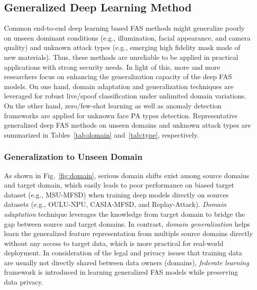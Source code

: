 \documentclass[10pt,journal,compsoc]{IEEEtran}
\begin{document}
\subsection{Generalized Deep Learning Method}









Common end-to-end deep learning based FAS methods might generalize poorly on unseen dominant conditions (e.g., illumination, facial appearance, and camera quality) and unknown attack types (e.g., emerging high fidelity mask made of new materials). Thus, these methods are unreliable to be applied in practical applications with strong security needs. In light of this, more and more researchers focus on enhancing the generalization capacity of the deep FAS models. On one hand, domain adaptation and generalization techniques are leveraged for robust live/spoof classification under unlimited domain variations. On the other hand, zero/few-shot learning as well as anomaly detection frameworks are applied for unknown face PA types detection. Representative generalized deep FAS methods on unseen domains and unknown attack types are summarized in Tables~\ref{tab:domain} and~\ref{tab:type}, respectively.  





\subsubsection{Generalization to Unseen Domain}





As shown in Fig.~\ref{fig:domain}, serious domain shifts exist among source domains and target domain, which easily leads to poor performance on biased target dataset (e.g., MSU-MFSD) when training deep models directly on sources datasets (e.g., OULU-NPU, CASIA-MFSD, and Replay-Attack). \textit{Domain adaptation} technique leverages the knowledge from target domain to bridge the gap between source and target domains. In contrast, \textit{domain generalization} helps learn the generalized feature representation from multiple source domains directly without any access to target data, which is more practical for real-world deployment. In consideration of the legal and privacy issues that training data are usually not directly shared between data owners (domains), \textit{federate learning} framework is introduced in learning generalized FAS models while preserving data privacy.
\end{document}

